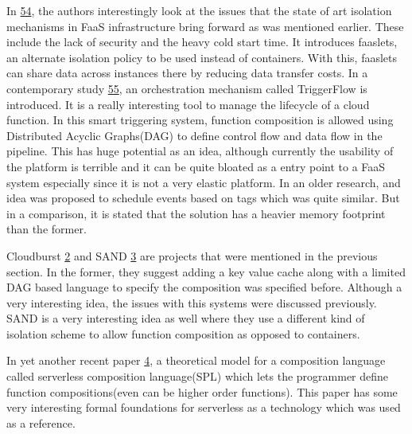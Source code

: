 \documentclass[12pt,titlepage]{article}
\begin{document}
In \hyperref[ref:54]{54}, the authors interestingly look at the issues that the state of art
isolation mechanisms in FaaS infrastructure bring forward as was mentioned
earlier. These include the lack of security and the heavy cold start time. It
introduces faaslets, an alternate isolation policy to be used instead of
containers. With this, faaslets can share data across instances there by
reducing data transfer costs. In a contemporary study \hyperref[ref:55]{55}, an
orchestration mechanism called TriggerFlow is introduced. It is a really
interesting tool to manage the lifecycle of a cloud function. In this smart
triggering system, function composition is allowed using Distributed Acyclic
Graphs(DAG) to define control flow and data flow in the pipeline. This has huge
potential as an idea, although currently the usability of the platform is
terrible and it can be quite bloated as a entry point to a FaaS system
especially since it is not a very elastic platform. In an older research, and
idea was proposed to schedule events based on tags which was quite similar. But
in a comparison, it is stated that the solution has a heavier memory footprint
than the former.


Cloudburst \hyperref[ref:2]{2} and SAND \hyperref[ref:3]{3} are projects that were mentioned in the previous
section. In the former, they suggest adding a key value cache along with
a limited DAG based language to specify the composition was specified before.
Although a very interesting idea, the issues with this systems were discussed
previously. SAND is a very interesting idea as well where they use a different
kind of isolation scheme to allow function composition as opposed to containers. 

In yet another recent paper \hyperref[ref:4]{4}, a theoretical model for a composition
language called serverless composition language(SPL) which lets the programmer
define function compositions(even can be higher order functions). This paper has
some very interesting formal foundations for serverless as a technology which
was used as a reference.
\end{document}

